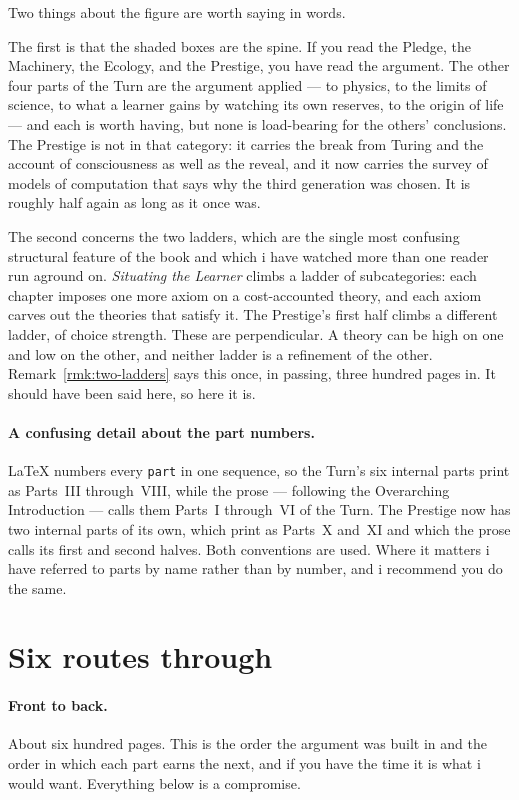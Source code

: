 Two things about the figure are worth saying in words.

The first is that the shaded boxes are the spine.
If you read the Pledge, the Machinery, the Ecology, and the
Prestige, you have read the argument.
The other four parts of the Turn are the argument applied --- to
physics, to the limits of science, to what a learner gains by watching
its own reserves, to the origin of life --- and each is worth having, but
none is load-bearing for the others' conclusions.
The Prestige is not in that category: it carries the break from Turing
and the account of consciousness as well as the reveal, and it now
carries the survey of models of computation that says why the third
generation was chosen.
It is roughly half again as long as it once was.

The second concerns the two ladders, which are the single most
confusing structural feature of the book and which i have watched
more than one reader run aground on.
\emph{Situating the Learner} climbs a ladder of subcategories: each
chapter imposes one more axiom on a cost-accounted theory, and each
axiom carves out the theories that satisfy it.
The Prestige's first half climbs a different ladder, of choice
strength.
These are perpendicular.
A theory can be high on one and low on the other, and neither
ladder is a refinement of the other.
Remark~\ref{rmk:two-ladders} says this once, in passing, three
hundred pages in.
It should have been said here, so here it is.

\paragraph{A confusing detail about the part numbers.}
\LaTeX{} numbers every \texttt{part} in one sequence, so the Turn's
six internal parts print as Parts~III through~VIII, while the prose
--- following the Overarching Introduction --- calls them Parts~I
through~VI of the Turn.
The Prestige now has two internal parts of its own, which print as
Parts~X and~XI and which the prose calls its first and second halves.
Both conventions are used.
Where it matters i have referred to parts by name rather than by
number, and i recommend you do the same.

\section*{Six routes through}

\paragraph{Front to back.}
About six hundred pages.
This is the order the argument was built in and the order in which
each part earns the next, and if you have the time it is what i
would want.
Everything below is a compromise.

